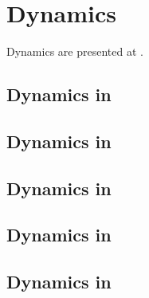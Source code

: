 



\chapter{Dynamics}\label{Dynamics}

Dynamics are presented at .


\section{Dynamics in \mxsrToMsr{}}


\section{Dynamics in \mxsrToMsr{}}


\section{Dynamics in \msrToMsr{}}


\section{Dynamics in \msrToLpsr{}}


\section{Dynamics in \lpsrToLilypond{}}


